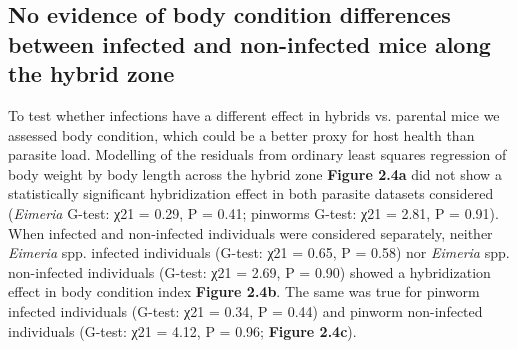 \subsection{No evidence of body condition differences between infected and non-infected mice along the hybrid zone}
To test whether infections have a different effect in hybrids vs. parental mice we assessed body condition, which could be a better proxy for host health than parasite load. Modelling of the residuals from ordinary least squares regression of body weight by body length across the hybrid zone \textbf{Figure 2.4a} did not show a statistically significant hybridization effect in both parasite datasets considered (\textit{Eimeria} G-test: χ21 = 0.29, P = 0.41; pinworms G-test: χ21 = 2.81, P = 0.91). When infected and non-infected individuals were considered separately, neither \textit{Eimeria} spp. infected individuals (G-test: χ21 = 0.65, P = 0.58) nor \textit{Eimeria} spp. non-infected individuals (G-test: χ21 = 2.69, P = 0.90) showed a hybridization effect in body condition index \textbf{Figure 2.4b}. The same was true for pinworm infected individuals (G-test: χ21 = 0.34, P = 0.44) and pinworm non-infected individuals (G-test: χ21 = 4.12, P = 0.96; \textbf{Figure 2.4c}). 

